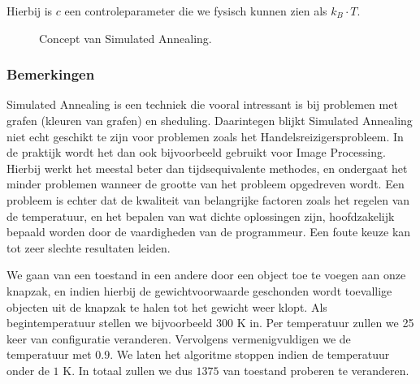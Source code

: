 Hierbij is $c$ een controleparameter die we fysisch kunnen zien als $k_B\cdot T$.
\begin{figure}[htb]
\centering
{}
\caption{Concept van Simulated Annealing.}
\label{fig:simulatedAnnealingConcept}
\end{figure}
\subsubsection{Bemerkingen}
Simulated Annealing is een techniek die vooral intressant is bij problemen met grafen (kleuren van grafen) en sheduling. Daarintegen blijkt Simulated Annealing niet echt geschikt te zijn voor problemen zoals het Handelsreizigersprobleem. In de praktijk wordt het dan ook bijvoorbeeld gebruikt voor Image Processing. Hierbij werkt het meestal beter dan tijdsequivalente methodes, en ondergaat het minder problemen wanneer de grootte van het probleem opgedreven wordt. Een probleem is echter dat de kwaliteit van belangrijke factoren zoals het regelen van de temperatuur, en het bepalen van wat dichte oplossingen zijn, hoofdzakelijk bepaald worden door de vaardigheden van de programmeur. Een foute keuze kan tot zeer slechte resultaten leiden.
\begin{leftbar}
We gaan van een toestand in een andere door een object toe te voegen aan onze knapzak, en indien hierbij de gewichtvoorwaarde geschonden wordt toevallige objecten uit de knapzak te halen tot het gewicht weer klopt. Als begintemperatuur stellen we bijvoorbeeld $300\mbox{ K}$ in. Per temperatuur zullen we 25 keer van configuratie veranderen. Vervolgens vermenigvuldigen we de temperatuur met $0.9$. We laten het algoritme stoppen indien de temperatuur onder de $1\mbox{ K}$. In totaal zullen we dus $1375$ van toestand proberen te veranderen.
\end{leftbar}
